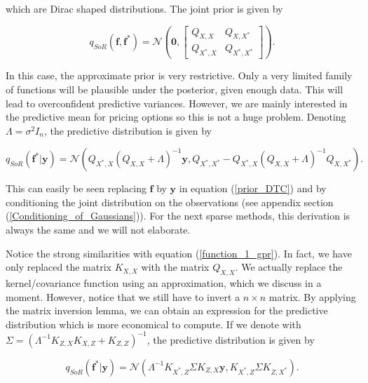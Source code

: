 \documentclass[12pt,a4paper,oneside]{book}
\begin{document}
which are Dirac shaped distributions. The joint prior is given by

\begin{equation}\label{prior_DTC}
q_{SoR}(\bm{f},\bm{f}^{\ast}) = 
\mathcal{N} \left( \bm{0}, 
\begin{bmatrix}
    Q_{X,X} & Q_{X,X^{\ast}}\\
    Q_{X^{\ast},X}  & Q_{X^{\ast},X^{\ast}}
\end{bmatrix} 
\right).
\end{equation}

In this case, the approximate prior is very restrictive. Only a very limited family of functions will be plausible under the posterior, given enough data. This will lead to overconfident predictive variances. However, we are mainly interested in the predictive mean for pricing options so this is not a huge problem. Denoting $\Lambda = \sigma^2 I_n$, the predictive distribution is given by 

\begin{equation}\label{sparse_sor}
q_{SoR} (\bm{f}^{\ast} | \bm{y} ) = \mathcal{N}(Q_{X^{\ast},X}(Q_{X,X} + \Lambda)^{-1}\bm{y}, Q_{X^{\ast} ,X^{\ast}} - Q_{X^{\ast},X}(Q_{X,X} + \Lambda)^{-1} Q_{X,X^{\ast}}).
\end{equation}

This can easily be seen replacing $\bm{f}$ by $\bm{y}$ in equation (\ref{prior_DTC}) and by conditioning the joint distribution on the observations (see appendix section (\ref{Conditioning_of_Gaussians})).  For the next sparse methods, this derivation is always the same and we will not elaborate. 

Notice the strong similarities with equation (\ref{function_1_gpr}). In fact, we have only replaced the matrix $K_{X,X}$ with the matrix $Q_{X,X}$. We actually replace the kernel/covariance function using an approximation, which we discuss in a moment. However, notice that we still have to invert a $n \times n$ matrix. By applying the matrix inversion lemma, we can obtain an expression for the predictive distribution which is more economical to compute. If we denote with $\Sigma = (\Lambda^{-1} K_{Z,X}K_{X,Z} + K_{Z,Z})^{-1}$, the predictive distribution is given by

\begin{equation}\label{pred_SoR}
\boxed{
q_{SoR} (\bm{f}^{\ast} | \bm{y} ) = \mathcal{N}(\Lambda^{-1} K_{X^{\ast},Z} \Sigma K_{Z,X} \bm{y},  K_{X^{\ast},Z} \Sigma K_{Z,X^{\ast}} ).}
\end{equation}
\end{document}
